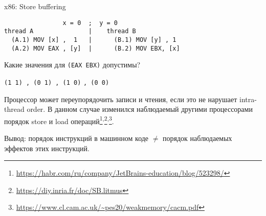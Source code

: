 \begin{frame}{x86: Store buffering}

\begin{adjustbox}{width=\textwidth,height=2cm,keepaspectratio}
\begin{lstlisting}
                x = 0  ;  y = 0
thread A               |    thread B          
  (A.1) MOV [x] ,  1   |      (B.1) MOV [y] , 1  
  (A.2) MOV EAX , [y]  |      (B.2) MOV EBX, [x] 
\end{lstlisting}
\end{adjustbox}

Какие значения для \texttt{(EAX EBX)} допустимы?

  \texttt{(1 1)\ , (0 1)\ , (1 0)}
\pause
\texttt{, (0 0)}

\pause
Процессор может переупорядочить записи и чтения, если это не нарушает intra-thread order.
\pause
В данном случае изменился наблюдаемый другими процессорами порядок store и load операций\footnote<4->{\tiny\url{https://habr.com/ru/company/JetBrains-education/blog/523298/}}\textsuperscript{,}\footnote<4->{\tiny\url{https://diy.inria.fr/doc/SB.litmus}}\textsuperscript{,}\footnote<4->{\tiny\url{https://www.cl.cam.ac.uk/~pes20/weakmemory/cacm.pdf}}.

\pause
Вывод: порядок инструкций в машинном коде $\neq$ порядок наблюдаемых эффектов этих инструкций.

\end{frame}



